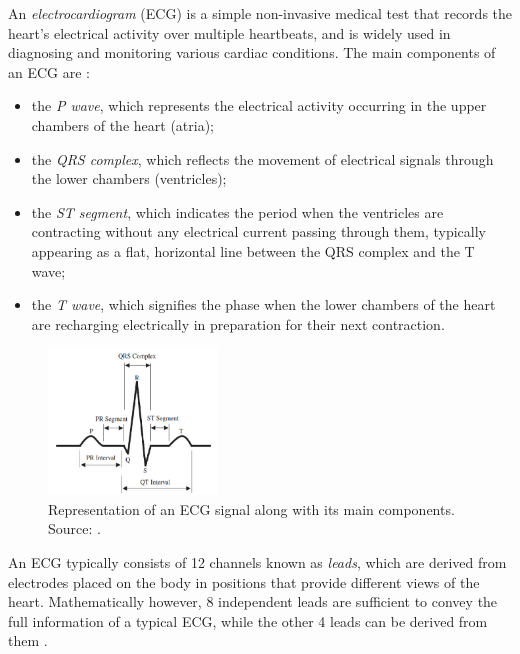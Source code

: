 \documentclass[a4paper,10pt]{article}
\begin{document}
An \emph{electrocardiogram} (ECG) is a simple non-invasive medical test that records the heart's electrical activity over multiple heartbeats, and is widely used in diagnosing and monitoring various cardiac conditions. The main components of an ECG are \cite{ecgdefinition}:
\begin{itemize}
	\item the \emph{P wave}, which represents the electrical activity occurring in the upper chambers of the heart (atria); 
	\item the \emph{QRS complex}, which reflects the movement of electrical signals through the lower chambers (ventricles); 
	\item the \emph{ST segment}, which indicates the period when the ventricles are contracting without any electrical current passing through them, typically appearing as a flat, horizontal line between the QRS complex and the T wave; \item the \emph{T wave}, which signifies the phase when the lower chambers of the heart are recharging electrically in preparation for their next contraction.
\end{itemize}

\begin{figure}[H]
	\centering
	\includegraphics[width=0.4\textwidth]{ecg_components.png}
	\caption{Representation of an ECG signal along with its main components. Source: \cite{ecgcomponents}.}%
	\label{fig:ecg_components}
\end{figure}

An ECG typically consists of 12 channels known as \emph{leads}, which are derived from electrodes placed on the body in positions that provide different views of the heart. Mathematically however, 8 independent leads are sufficient to convey the full information of a typical ECG, while the other 4 leads can be derived from them \cite{ecgleads}.
\end{document}
